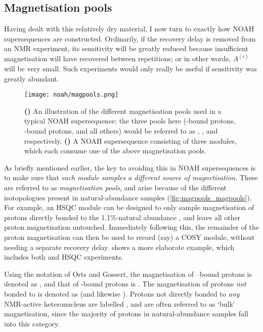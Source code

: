 \subsection{Magnetisation pools}
\label{subsec:noah__magpools}

Having dealt with this relatively dry material, I now turn to exactly how NOAH supersequences are constructed.
Ordinarily, if the recovery delay is removed from an NMR experiment, its sensitivity will be greatly reduced because insufficient magnetisation will have recovered between repetitions; or in other words, $A^{(i)}$ will be very small.
Such experiments would only really be useful if sensitivity was greatly abundant.

\begin{figure}[!ht]
    \centering
    \texttt{[image: noah/magpools.png]}%
    {\label{fig:magpools_magpools}}%
    {\label{fig:magpools_sequences}}%
    \caption[Different magnetisation pools used in a typical NOAH supersequence]{
        \textbf{()} An illustration of the different magnetisation pools used in a typical NOAH supersequence: the three pools here (\nitrogen{}-bound protons, \carbon{}-bound protons, and all others) would be referred to as , , and  respectively.
        \textbf{()} A NOAH supersequence consisting of three modules, which each consume one of the above magnetisation pools.
    }
    \label{fig:magpools}
\end{figure}

As briefly mentioned earlier, the key to avoiding this in NOAH supersequences is to make sure that \textit{each module samples a different source of magnetisation}.
These are referred to as \textit{magnetisation pools}, and arise because of the different isotopologues present in natural-abundance samples (\cref{fig:magpools_magpools}).
For example, an HSQC module can be designed to only sample magnetisation of protons directly bonded to the 1.1\%-natural abundance \carbon{}, and leave all other proton magnetisation untouched.
Immediately following this, the remainder of the proton magnetisation can then be used to record (say) a COSY module, without needing a separate recovery delay.
 shows a more elaborate example, which includes both \nitrogen{} and \carbon{} HSQC experiments.

Using the notation of Orts and Gossert\autocite{Orts2018M}, the magnetisation of \carbon{}--bound protons is denoted as , and that of \nitrogen{}-bound protons is .
The magnetisation of protons \textit{not} bonded to \carbon{} is denoted as  (and likewise ).
Protons not directly bonded to \textit{any} NMR-active heteronucleus are labelled , and are often referred to as `bulk' magnetisation, since the majority of protons in natural-abundance samples fall into this category.

